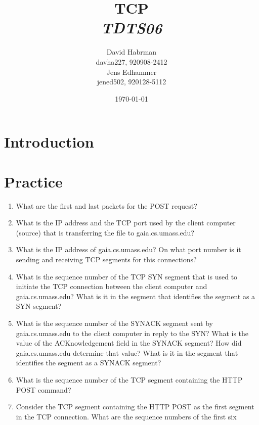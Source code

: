 \documentclass[10pt]{article}
\title{TCP\\
\emph{TDTS06}}
\author{David Habrman \\ davha227, 920908-2412\\
Jens Edhammer \\ jened502, 920128-5112 }
\date{\today}
\begin{document}
\maketitle

\newpage
\tableofcontents
\newpage

\section{Introduction}

\section{Practice}
\begin{enumerate}
  \item{What are the first and last packets for the POST request?}
  \item{What is the IP address and the TCP port used by the client
    computer (source) that is transferring the file to gaia.cs.umass.edu?}
  \item{What is the IP address of gaia.cs.umass.edu? On what port number
    is it sending and receiving TCP segments for this connections?}
  \item{What is the sequence number of the TCP SYN segment that is used
    to initiate the TCP connection between the client computer and
    gaia.cs.umass.edu? What is it in the segment that identifies the
    segment as a SYN segment?}
  \item{What is the sequence number of the SYNACK segment
    sent by gaia.cs.umass.edu to the client computer in reply
    to the SYN? What is the value of the ACKnowledgement field
    in the SYNACK segment? How did gaia.cs.umass.edu determine
    that value? What is it in the segment that identifies the segment
    as a SYNACK segment?}
  \item{What is the sequence number of the TCP segment
    containing the HTTP POST command?}
  \item{Consider the TCP segment containing the HTTP POST as the first segment
  in the TCP connection. What are the sequence numbers of the first six
}
\end{enumerate}
\end{document}
